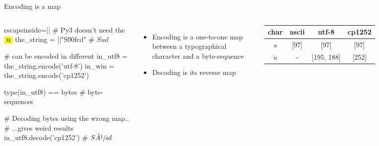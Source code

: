 \begin{pyframe}{Encoding is a map}
\begin{columns}


\begin{pycode*}{escapeinside=||}
# Py3 doesn't need the $\pyver{u}$ 
the_string = ||"S\u00fcd" # $S\ddot{u}d$

# can be encoded in different
in_utf8 =  the_string.encode('utf-8')
in_win = the_string.encode('cp1252')

type(in_utf8) == bytes # byte-sequences

# Decoding bytes using the wrong map..
# ...gives weird results
in_utf8.decode('cp1252') # $S\tilde{A}\sfrac{1}{4}d$





\end{pycode*}

\begin{itemize}
\item Encoding is a one-to-one map between a typographical character and a byte-sequence 
\item Decoding is its reverse map
\end{itemize}

\small
\begin{tabular}{|c||c|c|c|}\hline 
char        & ascii     & utf-8         & cp1252     \\ \hline
a           & [97]      & [97]          & [97]      \\ \hline     
$\ddot{u}$  & -         & [195, 188]    & [252]              \\ \hline
\end{tabular}
\end{columns}

\end{pyframe}




